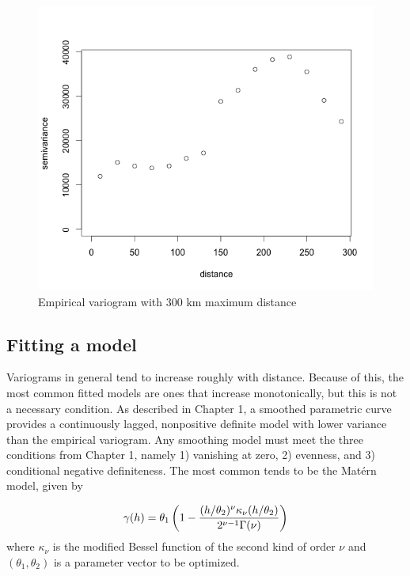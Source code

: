 \documentclass[12pt,twoside]{reedthesis}
\begin{document}
\begin{figure}[h]
	   
	       \centering
	  
	    \includegraphics[scale=0.6]{Variogram}
	
	     \caption{Empirical variogram with 300 km maximum distance}
	 \label{variogram}
	\end{figure}

\subsection{Fitting a model}

Variograms in general tend to increase roughly with distance. Because of this, the most common fitted models are ones that increase monotonically, but this is not a necessary condition. As described in Chapter 1, a smoothed parametric curve provides a continuously lagged, nonpositive definite model with lower variance than the empirical variogram. Any smoothing model must meet the three conditions from Chapter 1, namely 1) vanishing at zero, 2) evenness, and 3) conditional negative definiteness. The most common tends to be the Mat\'ern model, given by 

\begin{align*}
\gamma(h) = \theta_1\left (1-{{(h/\theta_2)^\nu\kappa_{\nu}(h/\theta_2)}\over{2^{\nu-1}\Gamma(\nu)}} \right )
\end{align*}
where $\kappa_\nu$ is the modified Bessel function of the second kind of order $\nu$ \cite{gelfand:2010} and $(\theta_1, \theta_2)$ is a parameter vector to be optimized. 
\end{document}
